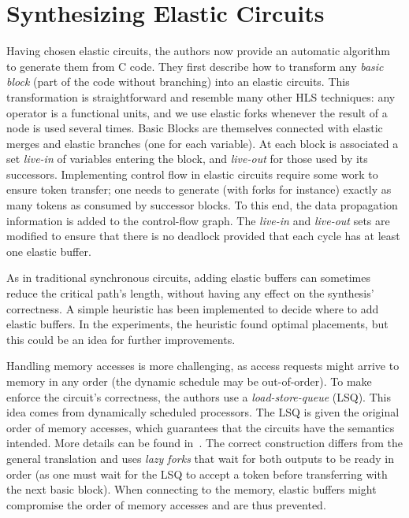 \documentclass{article}
\begin{document}
\section{Synthesizing Elastic Circuits}
Having chosen elastic circuits, the authors now provide an automatic algorithm to generate them from C code.
They first describe how to transform any \textit{basic block} (part of the code without branching) into an elastic circuits. This transformation is straightforward and resemble many other HLS techniques: any operator is a functional units, and we use elastic forks whenever the result of a node is used several times.
Basic Blocks are themselves connected with elastic merges and elastic branches (one for each variable).
At each block is associated a set \textit{live-in} of variables entering the block, and \textit{live-out} for those used by its successors.
Implementing control flow in elastic circuits require some work to ensure token transfer; one needs to generate (with forks for instance) exactly as many tokens as consumed by successor blocks. To this end, the data propagation information is added to the control-flow graph. The \textit{live-in} and \textit{live-out} sets are modified to ensure that there is no deadlock provided that each cycle has at least one elastic buffer.

As in traditional synchronous circuits, adding elastic buffers can sometimes reduce the critical path's length, without having any effect on the synthesis' correctness. A simple heuristic has been implemented to decide where to add elastic buffers. In the experiments, the heuristic found optimal placements, but this could be an idea for further improvements.

Handling memory accesses is more challenging, as access requests might arrive to memory in any order (the dynamic schedule may be out-of-order).
To make enforce the circuit's correctness, the authors use a \textit{load-store-queue} (LSQ). This idea comes from dynamically scheduled processors. The LSQ is given the original order of memory accesses, which guarantees that the circuits have the semantics intended. More details can be found in~\cite{DBLP:journals/tecs/JosipovicBI17}. The correct construction differs from the general translation and uses \textit{lazy forks} that wait for both outputs to be ready in order (as one must wait for the LSQ to accept a token before transferring with the next basic block). When connecting to the memory, elastic buffers might compromise the order of memory accesses and are thus prevented.
\end{document}
